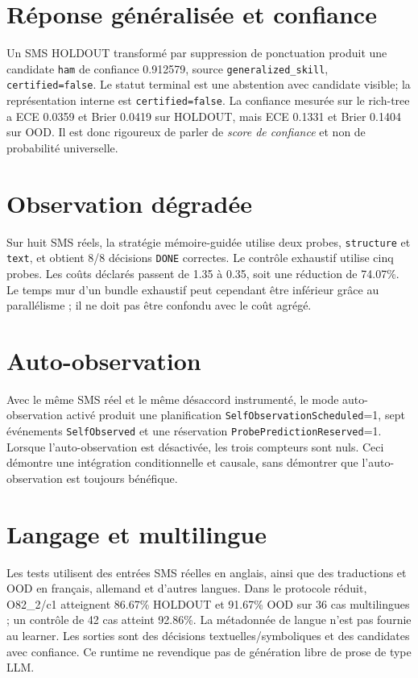 \documentclass[11pt,a4paper]{report}
\begin{document}
\section{Réponse généralisée et confiance}
Un SMS HOLDOUT transformé par suppression de ponctuation produit une candidate \texttt{ham} de confiance 0.912579, source \texttt{generalized\_skill}, \texttt{certified=false}. Le statut terminal est une abstention avec candidate visible; la représentation interne est \texttt{certified=false}. La confiance mesurée sur le rich-tree a ECE 0.0359 et Brier 0.0419 sur HOLDOUT, mais ECE 0.1331 et Brier 0.1404 sur OOD. Il est donc rigoureux de parler de \emph{score de confiance} et non de probabilité universelle.

\section{Observation dégradée}
Sur huit SMS réels, la stratégie mémoire-guidée utilise deux probes, \texttt{structure} et \texttt{text}, et obtient 8/8 décisions \texttt{DONE} correctes. Le contrôle exhaustif utilise cinq probes. Les coûts déclarés passent de 1.35 à 0.35, soit une réduction de 74.07\%. Le temps mur d'un bundle exhaustif peut cependant être inférieur grâce au parallélisme ; il ne doit pas être confondu avec le coût agrégé.

\section{Auto-observation}
Avec le même SMS réel et le même désaccord instrumenté, le mode auto-observation activé produit une planification \texttt{SelfObservationScheduled}=1, sept événements \texttt{SelfObserved} et une réservation \texttt{ProbePredictionReserved}=1. Lorsque l'auto-observation est désactivée, les trois compteurs sont nuls. Ceci démontre une intégration conditionnelle et causale, sans démontrer que l'auto-observation est toujours bénéfique.

\section{Langage et multilingue}
Les tests utilisent des entrées SMS réelles en anglais, ainsi que des traductions et OOD en français, allemand et d'autres langues. Dans le protocole réduit, O82\_2/c1 atteignent 86.67\% HOLDOUT et 91.67\% OOD sur 36 cas multilingues ; un contrôle de 42 cas atteint 92.86\%. La métadonnée de langue n'est pas fournie au learner. Les sorties sont des décisions textuelles/symboliques et des candidates avec confiance. Ce runtime ne revendique pas de génération libre de prose de type LLM.
\end{document}
